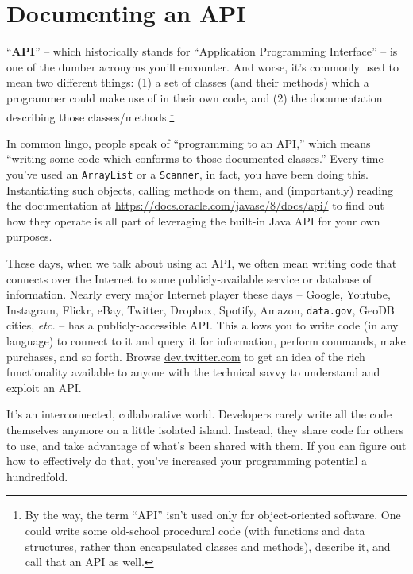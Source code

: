 

\chapter{Documenting an API}
\label{ch:api}

``\textbf{API}'' -- which historically stands for ``Application Programming
Interface'' -- is one of the dumber acronyms you'll encounter. And worse, it's
commonly used to mean two different things: (1) a set of classes (and their
methods) which a programmer could make use of in their own code, and (2) the
documentation describing those classes/methods.\footnote{By the way, the term
``API'' isn't used only for object-oriented software. One could write some
old-school procedural code (with functions and data structures, rather than
encapsulated classes and methods), describe it, and call that an API as well.}

In common lingo, people speak of ``programming to an API,'' which means
``writing some code which conforms to those documented classes.'' Every
time you've used an \texttt{ArrayList} or a \texttt{Scanner}, in fact, you
have been doing this. Instantiating such objects, calling methods on them, and
(importantly) reading the documentation at
\url{https://docs.oracle.com/javase/8/docs/api/} to find out how they
operate is all part of leveraging the built-in Java API for your own purposes.

These days, when we talk about using an API, we often mean writing code that
connects over the Internet to some publicly-available service or database of
information. Nearly every major Internet player these days -- Google, Youtube,
Instagram, Flickr, eBay, Twitter, Dropbox, Spotify, Amazon, \texttt{data.gov},
GeoDB cities, \textit{etc.} -- has a publicly-accessible API. This allows you
to write code (in any language) to connect to it and query it for information,
perform commands, make purchases, and so forth. Browse \url{dev.twitter.com} to
get an idea of the rich functionality available to anyone with the technical
savvy to understand and exploit an API.

It's an interconnected, collaborative world. Developers rarely write all the
code themselves anymore on a little isolated island. Instead, they share code
for others to use, and take advantage of what's been shared with them. If you
can figure out how to effectively do that, you've increased your programming
potential a hundredfold.

